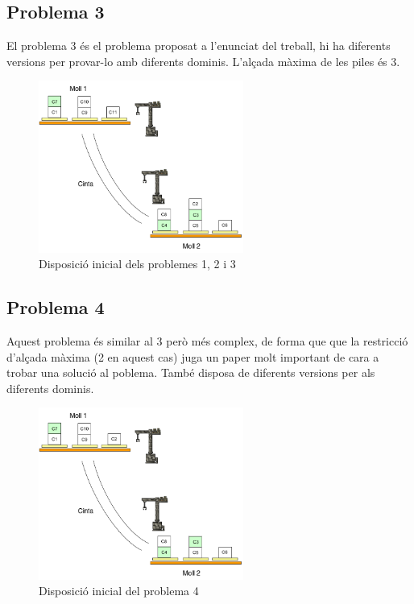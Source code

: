 \documentclass[10pt,a4paper]{article}
\begin{document}
\subsection*{Problema 3}
El problema 3 és el problema proposat a l'enunciat del treball, hi ha diferents versions per provar-lo amb diferents dominis. L'alçada màxima de les piles és 3.

\begin{figure}[h]
\centering
\includegraphics[width=0.6\textwidth]{prob123}
\caption{Disposició inicial dels problemes 1, 2 i 3}
\label{fig:p123}
\end{figure}

\subsection*{Problema 4}
Aquest problema és similar al 3 però més complex, de forma que que la restricció d'alçada màxima (2 en aquest cas) juga un paper
molt important de cara a trobar una solució al poblema. També disposa de diferents versions per als diferents dominis.

\begin{figure}[h]
\centering
\includegraphics[width=0.6\textwidth]{prob4}
\caption{Disposició inicial del problema 4}
\label{fig:p4}
\end{figure}
\end{document}
